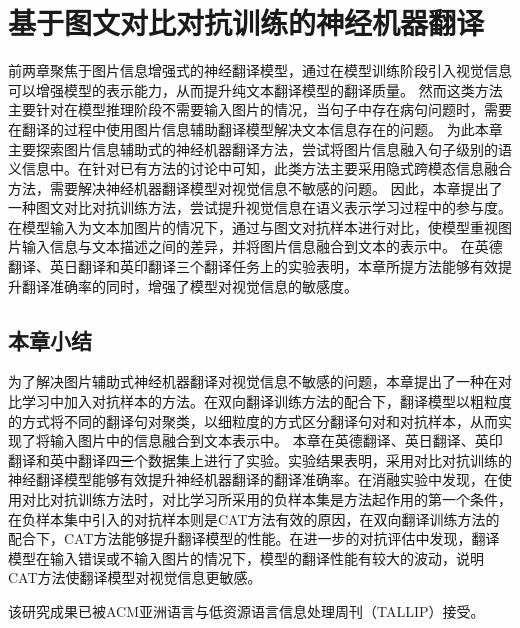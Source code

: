 \chapter{基于图文对比对抗训练的神经机器翻译}
前两章聚焦于图片信息增强式的神经翻译模型，通过在模型训练阶段引入视觉信息可以增强模型的表示能力，从而提升纯文本翻译模型的翻译质量。
然而这类方法主要针对在模型推理阶段不需要输入图片的情况，当句子中存在病句问题时，需要在翻译的过程中使用图片信息辅助翻译模型解决文本信息存在的问题。
为此本章主要探索图片信息辅助式的神经机器翻译方法，尝试将图片信息融入句子级别的语义信息中。在针对已有方法的讨论中可知，此类方法主要采用隐式跨模态信息融合方法，需要解决神经机器翻译模型对视觉信息不敏感的问题。
因此，本章提出了一种图文对比对抗训练方法，尝试提升视觉信息在语义表示学习过程中的参与度。在模型输入为文本加图片的情况下，通过与图文对抗样本进行对比，使模型重视图片输入信息与文本描述之间的差异，并将图片信息融合到文本的表示中。
在英德翻译、英日翻译和英印翻译三个翻译任务上的实验表明，本章所提方法能够有效提升翻译准确率的同时，增强了模型对视觉信息的敏感度。







\section{本章小结}
为了解决图片辅助式神经机器翻译对视觉信息不敏感的问题，本章提出了一种在对比学习中加入对抗样本的方法。在双向翻译训练方法的配合下，翻译模型以粗粒度的方式将不同的翻译句对聚类，以细粒度的方式区分翻译句对和对抗样本，从而实现了将输入图片中的信息融合到文本表示中。
本章在英德翻译、英日翻译、英印翻译和英中翻译四\sout{三}个数据集上进行了实验。实验结果表明，采用对比对抗训练的神经翻译模型能够有效提升神经机器翻译的翻译准确率。在消融实验中发现，在使用对比对抗训练方法时，对比学习所采用的负样本集是方法起作用的第一个条件，在负样本集中引入的对抗样本则是CAT方法有效的原因，在双向翻译训练方法的配合下，CAT方法能够提升翻译模型的性能。在进一步的对抗评估中发现，翻译模型在输入错误或不输入图片的情况下，模型的翻译性能有较大的波动，说明CAT方法使翻译模型对视觉信息更敏感。

该研究成果已被ACM亚洲语言与低资源语言信息处理周刊（TALLIP）接受。